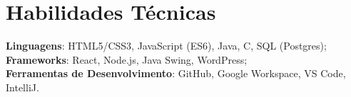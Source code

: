 \documentclass[letterpaper,11pt]{article}
\begin{document}
\section{Habilidades Técnicas}
 \begin{itemize}[leftmargin=0.15in, label={}]
    \small{\item{
     \textbf{Linguagens}{: HTML5/CSS3, JavaScript (ES6), Java, C, SQL (Postgres);} \\
     \textbf{Frameworks}{: React, Node.js, Java Swing, WordPress;} \\
     \textbf{Ferramentas de Desenvolvimento}{: GitHub, Google Workspace, VS Code, IntelliJ.} \\
    }}
 \end{itemize}

\end{document}
